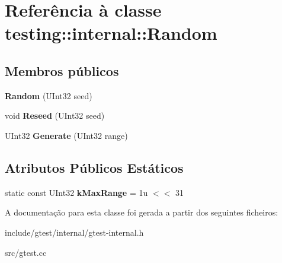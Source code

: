 \hypertarget{classtesting_1_1internal_1_1Random}{\section{Referência à classe testing\-:\-:internal\-:\-:Random}
\label{classtesting_1_1internal_1_1Random}
}
\subsection*{Membros públicos}
\begin{DoxyCompactItemize}
\item 
\hypertarget{classtesting_1_1internal_1_1Random_a6e112be5e7cce00551f6383025f69460}{{\bfseries Random} (U\-Int32 seed)}\label{classtesting_1_1internal_1_1Random_a6e112be5e7cce00551f6383025f69460}

\item 
\hypertarget{classtesting_1_1internal_1_1Random_adf2f24199318a46f885c78f50d89a69e}{void {\bfseries Reseed} (U\-Int32 seed)}\label{classtesting_1_1internal_1_1Random_adf2f24199318a46f885c78f50d89a69e}

\item 
\hypertarget{classtesting_1_1internal_1_1Random_a9315b7fb621cbcfdf92ed4b5e584c0db}{U\-Int32 {\bfseries Generate} (U\-Int32 range)}\label{classtesting_1_1internal_1_1Random_a9315b7fb621cbcfdf92ed4b5e584c0db}

\end{DoxyCompactItemize}
\subsection*{Atributos Públicos Estáticos}
\begin{DoxyCompactItemize}
\item 
\hypertarget{classtesting_1_1internal_1_1Random_a36d72dd7063d0b5338f229e75382fdd2}{static const U\-Int32 {\bfseries k\-Max\-Range} = 1u $<$$<$ 31}\label{classtesting_1_1internal_1_1Random_a36d72dd7063d0b5338f229e75382fdd2}

\end{DoxyCompactItemize}


A documentação para esta classe foi gerada a partir dos seguintes ficheiros\-:\begin{DoxyCompactItemize}
\item 
include/gtest/internal/gtest-\/internal.\-h\item 
src/gtest.\-cc\end{DoxyCompactItemize}
